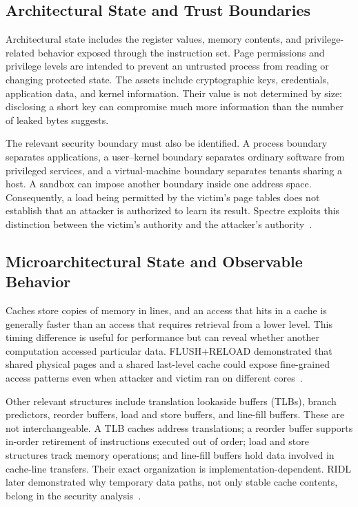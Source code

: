 \documentclass[man,12pt,apacite,nofontenc,nolmodern,floatsintext]{apa6}
\begin{document}
\subsection{Architectural State and Trust Boundaries}
Architectural state includes the register values, memory contents, and privilege-related behavior exposed through the instruction set. Page permissions and privilege levels are intended to prevent an untrusted process from reading or changing protected state. The assets include cryptographic keys, credentials, application data, and kernel information. Their value is not determined by size: disclosing a short key can compromise much more information than the number of leaked bytes suggests.

The relevant security boundary must also be identified. A process boundary separates applications, a user--kernel boundary separates ordinary software from privileged services, and a virtual-machine boundary separates tenants sharing a host. A sandbox can impose another boundary inside one address space. Consequently, a load being permitted by the victim's page tables does not establish that an attacker is authorized to learn its result. Spectre exploits this distinction between the victim's authority and the attacker's authority~\cite{spectre2019}.

\subsection{Microarchitectural State and Observable Behavior}
Caches store copies of memory in lines, and an access that hits in a cache is generally faster than an access that requires retrieval from a lower level. This timing difference is useful for performance but can reveal whether another computation accessed particular data. FLUSH+RELOAD demonstrated that shared physical pages and a shared last-level cache could expose fine-grained access patterns even when attacker and victim ran on different cores~\cite{yarom2014}.

Other relevant structures include translation lookaside buffers (TLBs), branch predictors, reorder buffers, load and store buffers, and line-fill buffers. These are not interchangeable. A TLB caches address translations; a reorder buffer supports in-order retirement of instructions executed out of order; load and store structures track memory operations; and line-fill buffers hold data involved in cache-line transfers. Their exact organization is implementation-dependent. RIDL later demonstrated why temporary data paths, not only stable cache contents, belong in the security analysis~\cite{ridl2019}.
\end{document}
